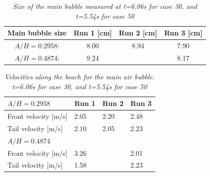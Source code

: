 \documentclass[review]{elsarticle}
\begin{document}
\begin{table}[]
\centering
\caption{\textit{ Size of the main bubble measured at t=6.06s for case 30, and t=5.54s for case 50}}
\label{my-label}
\begin{tabular}{|c|c|c|c|}
\hline
\textbf{Main bubble size }              & \textbf{Run 1 {[}cm{]}} & \textbf{Run 2 {[}cm{]}} & \textbf{Run 3 {[}cm{]}} \\ \hline
$A/H=0.2958$:  & 8.00     & 8.94     & 7.90     \\ \hline
$A/H=0.4874$: & 9.24     &      & 8.17     \\ \hline
\end{tabular}
\label{tab:b_case30}
\end{table}
 
 
\begin{table}[]
\centering
\caption{\textit{ Velocities along the beach for the main air bubble.  t=6.06s for case 30, and t=5.54s for case 50}}
\label{vel_bubb}
\begin{tabular}{llll}
\hline
{\bf $A/H=0.2958$}                    & Run 1 & Run 2 & Run 3 \\ \hline
Front velocity {[}m/s{]}  & 2.05  & 2.20  & 2.48  \\
Tail velocity {[}m/s{]}  & 2.10  & 2.05  & 2.23  \\ \hline
{\bf $A/H=0.4874$}                    &       &       &       \\ \hline
Front velocity {[}m/s{]}  & 3.26  &   & 2.01  \\
Tail velocity {[}m/s{]}   & 1.58  &   & 2.23 
\end{tabular}
\end{table} 
 
\end{document}
